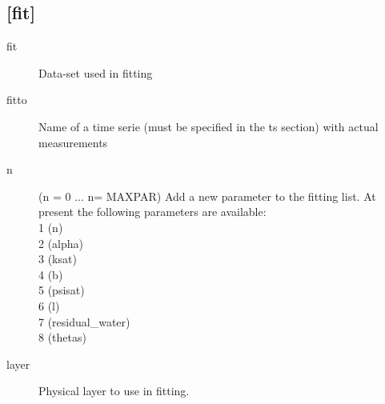 \subsection{[fit]}\label{section:fit}
\begin{description}
\item[fit]
Data-set used in fitting

\item[fitto]
Name of a time serie (must be specified in the ts section) with
actual measurements

\item[n]
(n = 0 ... n= MAXPAR)
Add a new parameter to the fitting list.
At present the following
parameters are available:
\\
1 (n)
\\
2 (alpha)
\\
3 (ksat)
\\
4 (b)
\\
5 (psisat)
\\
6 (l)
\\
7 (residual\_water)
\\
8 (thetas)

\item[layer]
Physical layer to use in fitting.
\end{description}



